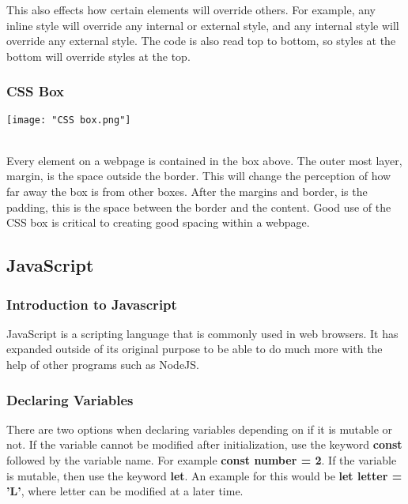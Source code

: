 \documentclass[12pt]{report}
\begin{document}
					This also effects how certain elements will override others. For example, any inline style will override any internal or external style, and any internal style will override any external style. The code is also read top to bottom, so styles at the bottom will override styles at the top.

				\subsubsection{CSS Box}

					\begin{center}
						\texttt{[image: "CSS box.png"]}\\
						\autocite{w3-box}\\
					\end{center}

					Every element on a webpage is contained in the box above. The outer most layer, margin, is the space outside the border. This will change the perception of how far away the box is from other boxes. After the margins and border, is the padding, this is the space between the border and the content. Good use of the CSS box is critical to creating good spacing within a webpage.

			\subsection{JavaScript}
				\label{week-1-js}
				\bigskip
				\subsubsection{Introduction to Javascript}
					JavaScript is a scripting language that is commonly used in web browsers. It has expanded outside of its original purpose to be able to do much more with the help of other programs such as NodeJS.\\

				\subsubsection{Declaring Variables}
					There are two options when declaring variables depending on if it is mutable or not. If the variable cannot be modified after initialization, use the keyword \textbf{const} followed by the variable name. For example \textbf{const number = 2}. If the variable is mutable, then use the keyword \textbf{let}. An example for this would be \textbf{let letter = 'L'}, where letter can be modified at a later time.
\end{document}
